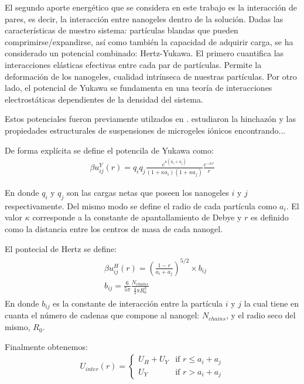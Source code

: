 	El segundo aporte energ\'etico que se considera en este trabajo es la interacci\'on de pares, es decir, la interacci\'on entre nanogeles dentro de la soluci\'on.
	Dadas las caracter\'isticas de nuestro sistema: part\'iculas blandas que pueden comprimirse/expandirse, as\'i como tambi\'en la capacidad de adquirir carga, se ha considerado un potencial combinado: Hertz-Yukawa.
	El primero cuantifica las interacciones el\'asticas efectivas entre cada par de part\'iculas. Permite la deformaci\'on de los nanogeles, cualidad intr\'inseca de nuestras part\'iculas.
	Por otro lado, el potencial de Yukawa se fundamenta en una teor\'ia de interacciones electrost\'aticas dependientes de la densidad del sistema.
	
	
	
	Estos potenciales fueron previamente utilzados en \cite{weyer2018concentration}. \citet{weyer2018concentration} estudiaron la hinchaz\'on y las propiedades estructurales de suspensiones de microgeles i\'onicos encontrando...
	
	De forma expl\'icita se define el potencila de Yukawa como: 
	\begin{align}
		\beta u^Y_{ij}(r) = q_i q_j \frac{e^{\kappa(a_i + a_j)}}{(1 +\kappa a_i)(1 + \kappa a_j)} \frac{e^{-\kappa r}}{r} 
		\label{eq:mc:yukawa}
	\end{align}
	
	\noindent En donde $q_i$ y $q_j$ son las cargas netas que poseen los nanogeles $i$ y $j$ respectivamente. Del mismo modo se define el radio de cada part\'icula como $a_i$. El valor $\kappa$ corresponde a la constante de apantallamiento de Debye y $r$ es definido como la distancia entre los centros de masa de cada nanogel.
	
	El pontecial de Hertz  se define:
	\begin{align}
		\begin{aligned}
			& \beta u^H_{ij} (r) = \left(\frac{1-r}{a_i + a_j}\right)^{5/2}\times b_{ij} \\
			& b_{ij} = \frac{6}{5\pi}\frac{N_{chains}}{\frac{4}{3}\pi R_0^3}
		\end{aligned}
	\end{align}
	\noindent En donde $b_{ij}$ es la constante de interacci\'on entre la part\'icula $i$ y $j$ la cual tiene en cuanta el n\'umero de cadenas que compone al nanogel: $N_{chains}$, y el radio seco del mismo, $R_0$.
	
	Finalmente obtenemos:
	\begin{align}
		U_{inter}(r) = \begin{cases} U_H + U_Y & \text{if } r \leq a_i + a_j \\ U_Y & \text{if } r > a_i + a_j \end{cases} 
		\label{eq:mc:HY-potential}
	\end{align}
	
